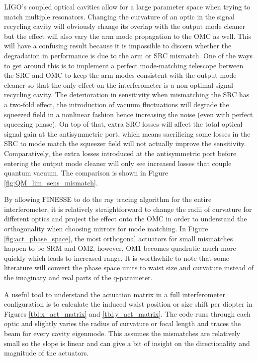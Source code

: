 	LIGO's coupled optical cavities allow for a large parameter space when trying to match multiple resonators.   Changing the curvature of an optic in the signal recycling cavity will obviously change its overlap with the output mode cleaner but the effect will also vary the arm mode propagation to the OMC as well.  This will have a confusing result because it is impossible to discern whether the degradation in performance is due to the arm or SRC mismatch.  One of the ways to get around this is to implement a perfect mode-matching telescope between the SRC and OMC to keep the arm modes consistent with the output mode cleaner so that the only effect on the interferometer is a non-optimal signal recycling cavity.  The deterioration in sensitivity when mismatching the SRC has a two-fold effect, the introduction of vacuum fluctuations will degrade the squeezed field in a nonlinear fashion hence increasing the noise (even with perfect squeezing phase).  On top of that, extra SRC losses will affect the total optical signal gain at the antisymmetric port, which means sacrificing some losses in the SRC to mode match the squeezer field will not actually improve the sensitivity.  Comparatively, the extra losses introduced at the antisymmetric port before entering the output mode cleaner will only see increased losses that couple quantum vacuum.  The comparison is shown in Figure \ref{fig:QM_lim_sens_mismatch}.
	
	By allowing FINESSE to do the ray tracing algorithm for the entire interferometer, it is relatively straightforward to change the radii of curvature for different optics and project the effect onto the OMC in order to understand the orthogonality when choosing mirrors for mode matching.  In Figure \ref{fig:act_phase_space}, the most orthogonal actuators for small mismatches happen to be SRM and OM2, however, OM1 becomes quadratic much more quickly which leads to increased range. It is worthwhile to note that some literature will convert the phase space units to waist size and curvature instead of the imaginary and real parts of the q-parameter.
	
	A useful tool to understand the actuation matrix in a full interferometer configuration is to calculate the induced waist position or size shift per diopter in Figures \ref{tbl:x_act_matrix} and \ref{tbl:y_act_matrix}.  The code runs through each optic and slightly varies the radius of curvature or focal length and traces the beam for every cavity eigenmode.  This assumes the mismatches are relatively small so the slope is linear and can give a bit of insight on the directionality and magnitude of the actuators.

